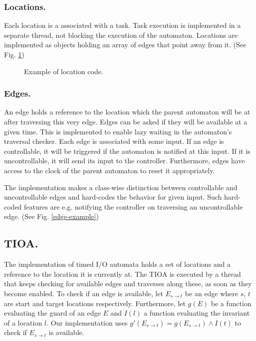 \subsubsection{Locations.}

Each location is a associated with a task. Task execution is implemented
in a separate thread, not blocking the execution of the automaton.
Locations are implemented as objects holding an array of edges that
point away from it. (See Fig. \ref{location-example})

\begin{figure}[t]

\caption{Example of location code.}
\label{location-example}
\end{figure}


\subsubsection{Edges.}

An edge holds a reference to the location which the parent automaton
will be at after traversing this very edge. Edges can be asked if
they will be available at a given time. This is implemented to enable
lazy waiting in the automaton's traversal checker. Each edge is associated
with some input. If an edge is controllable, it will be triggered
if the automaton is notified at this input. If it is uncontrollable,
it will send its input to the controller. Furthermore, edges have
access to the clock of the parent automaton to reset it appropriately.

The implementation makes a class-wise distinction between controllable
and uncontrollable edges and hard-codes the behavior for given input.
Such hard-coded features are e.g. notifying the controller on traversing
an uncontrollable edge. (See Fig. \ref{edge-example})


\subsection{TIOA.}

The implementation of timed I/O automata holds a set of locations
and a reference to the location it is currently at. The TIOA is executed
by a thread that keeps checking for available edges and traverses
along these, as soon as they become enabled. To check if an edge is
available, let $E_{s\rightarrow t}$ be an edge where $s,\, t$ are
start and target locations respectively. Furthermore, let $g(E)$
be a function evaluating the guard of an edge $E$ and $I(l)$ a function
evaluating the invariant of a location $l$. Our implementation uses
$g'(E_{s\rightarrow t})=g(E_{s\rightarrow t})\wedge I(t)$ to check
if $E_{s\rightarrow t}$ is available.

